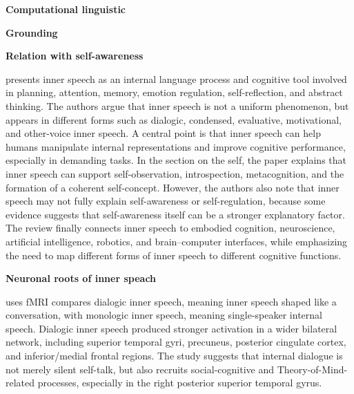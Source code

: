 \documentclass{book}
\providecommand{\ProjectDeepHeading}[2]{%
    \par\medskip\noindent\textbf{#2}\par\smallskip
}
\begin{document}

\ProjectDeepHeading{7}{Computational linguistic}


\ProjectDeepHeading{7}{Grounding}


\ProjectDeepHeading{7}{Relation with self-awareness}
        \cite{fernyhough-2023-inner-speech-as-language-process-and-cognitive-tool} presents inner speech as an internal language process and cognitive tool involved in planning, attention, memory, emotion regulation, self-reflection, and abstract thinking. The authors argue that inner speech is not a uniform phenomenon, but appears in different forms such as dialogic, condensed, evaluative, motivational, and other-voice inner speech. A central point is that inner speech can help humans manipulate internal representations and improve cognitive performance, especially in demanding tasks. In the section on the self, the paper explains that inner speech can support self-observation, introspection, metacognition, and the formation of a coherent self-concept. However, the authors also note that inner speech may not fully explain self-awareness or self-regulation, because some evidence suggests that self-awareness itself can be a stronger explanatory factor. The review finally connects inner speech to embodied cognition, neuroscience, artificial intelligence, robotics, and brain–computer interfaces, while emphasizing the need to map different forms of inner speech to different cognitive functions.
    
    
    \ProjectDeepHeading{7}{Neuronal roots of inner speach}
        \cite{alderson-day-2016-the-brains-conversation-with-itself-neural-substrates-of-dialogic-inner-speech} uses fMRI compares dialogic inner speech, meaning inner speech shaped like a conversation, with monologic inner speech, meaning single-speaker internal speech. Dialogic inner speech produced stronger activation in a wider bilateral network, including superior temporal gyri, precuneus, posterior cingulate cortex, and inferior/medial frontal regions. The study suggests that internal dialogue is not merely silent self-talk, but also recruits social-cognitive and Theory-of-Mind-related processes, especially in the right posterior superior temporal gyrus.
    
\end{document}

